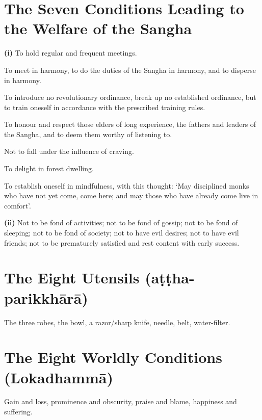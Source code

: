 \section*{The Seven Conditions Leading to the Welfare of the Sangha}

\textbf{(i)} To hold regular and frequent meetings.

To meet in harmony, to do the duties of the Sangha in harmony, and to disperse
in harmony.

To introduce no revolutionary ordinance, break up no established ordinance, but
to train oneself in accordance with the prescribed training rules.

To honour and respect those elders of long experience, the fathers and leaders
of the Sangha, and to deem them worthy of listening to.

Not to fall under the influence of craving.

To delight in forest dwelling.

To establish oneself in mindfulness, with this thought: ‘May disciplined monks
who have not yet come, come here; and may those who have already come live in
comfort’.

\textbf{(ii)} Not to be fond of activities;
not to be fond of gossip;
not to be fond of sleeping;
not to be fond of society;
not to have evil desires;
not to have evil friends;
not to be prematurely satisfied and rest content with early success.\\
\mbox{}

\section*{The Eight Utensils (aṭṭha-parikkhārā)}

The three robes, the bowl, a razor/sharp knife, needle, belt, water-filter.\\
\mbox{}

\vspace*{-\baselineskip}

\section*{The Eight Worldly Conditions (Lokadhammā)}

Gain and loss, prominence and obscurity, praise and blame, happiness and suffering.\\
\mbox{}

\vspace*{-\baselineskip}

